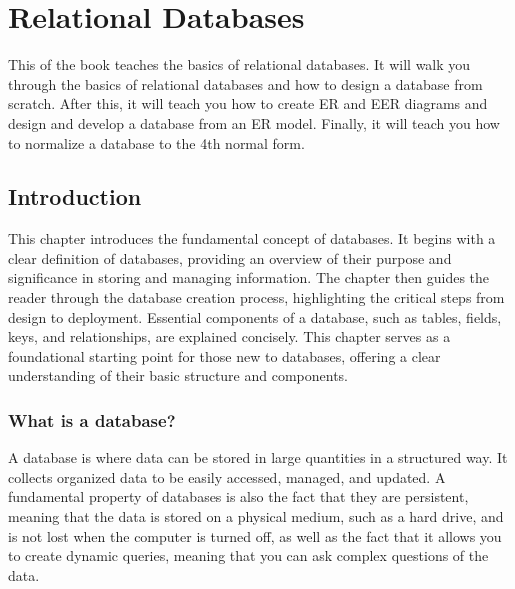 

\part{Relational Databases}
\label{part:relationaldatabases}
This  of the book teaches the basics of relational databases. It will walk you through the basics of relational databases and how to design a database from scratch. After this, it will teach you how to create ER and EER diagrams and design and develop a database from an ER model. Finally, it will teach you how to normalize a database to the 4th normal form.

\chapter{Introduction}
\label{chap:relational:introduction}
This chapter introduces the fundamental concept of databases. It begins with a clear definition of databases, providing an overview of their purpose and significance in storing and managing information. The chapter then guides the reader through the database creation process, highlighting the critical steps from design to deployment. Essential components of a database, such as tables, fields, keys, and relationships, are explained concisely. This chapter serves as a foundational starting point for those new to databases, offering a clear understanding of their basic structure and components.

\section{What is a database?}
A database is where data can be stored in large quantities in a structured way. It collects organized data to be easily accessed, managed, and updated. A fundamental property of databases is also the fact that they are persistent, meaning that the data is stored on a physical medium, such as a hard drive, and is not lost when the computer is turned off, as well as the fact that it allows you to create dynamic queries, meaning that you can ask complex questions of the data.

